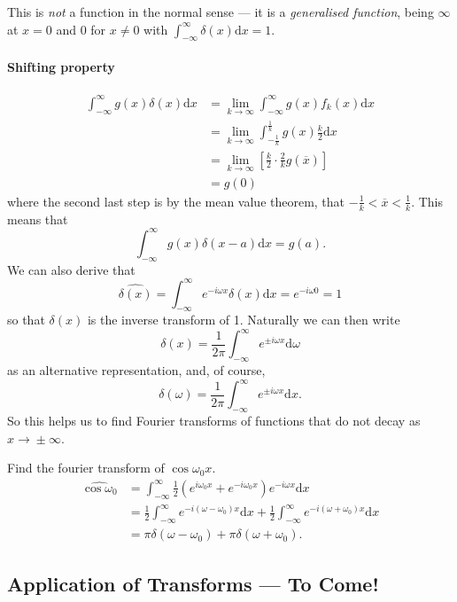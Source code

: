 \documentclass[12pt]{report}
\theoremstyle{definition}
\begin{document}
This is \emph{not} a function in the normal sense ---
it is a \emph{generalised function}, being $\infty$ at $x=0$ and 0 for $x\neq 0$
with $\int_{-\infty}^{\infty} \delta(x)\mathrm{d}x=1$.

\paragraph{Shifting property}
\begin{align*}
    \int_{-\infty}^{\infty} g(x)\delta(x)\mathrm{d}x
    & = \lim_{k\rightarrow{}\infty}\int_{-\infty}^{\infty} g(x)f_k(x)\mathrm{d}x \\
    & = \lim_{k\rightarrow{}\infty}\int_{-\frac{1}{k}}^{\frac{1}{k}} g(x)\frac{k}{2}\mathrm{d}x \\
    & = \lim_{k\rightarrow{}\infty}\left[\frac{k}{2}\cdot \frac{2}{k}g(\overline{x})\right] \\
    & = g(0)
\end{align*} 
where the second last step is by the mean value theorem, that $-\frac{1}{k}<\overline{x}<\frac{1}{k}$.
This means that\[
    \int_{-\infty}^{\infty} g(x)\delta(x-a)\mathrm{d}x = g(a).
\]We can also derive that\[
\widehat{\delta(x)} = \int_{-\infty}^{\infty} e^{-i\omega x}\delta(x)\mathrm{d}x = e^{-i\omega 0}= 1
\]
so that $\delta(x)$ is the inverse transform of 1. Naturally we can then write\[
    \delta(x) = \frac{1}{2\pi}\int_{-\infty}^{\infty} e^{\pm i\omega x}\mathrm{d}\omega
\]as an alternative representation, and, of course,\[
    \delta(\omega) = \frac{1}{2\pi}\int_{-\infty}^{\infty} e^{\pm i\omega x}\mathrm{d}x.
\]So this helps us to find Fourier transforms of functions that do not decay as $x\rightarrow{}\pm\infty$.

\begin{ex}
    Find the fourier transform of $\cos{\omega_0x}$.
    \begin{align*}
        \widehat{\cos{\omega_0}}
        & = \int_{-\infty}^{\infty} \frac{1}{2}(e^{i\omega_0x}+e^{-i\omega_0x})e^{-i\omega x}\mathrm{d}x \\
        & = \frac{1}{2}\int_{-\infty}^{\infty} e^{-i(\omega-\omega_0)x}\mathrm{d}x
        + \frac{1}{2}\int_{-\infty}^{\infty} e^{-i(\omega+\omega_0)x}\mathrm{d}x \\
        & = \pi\delta(\omega-\omega_0) + \pi\delta(\omega+\omega_0).
    \end{align*}
\end{ex} 

\subsection{Application of Transforms --- To Come!}
\end{document}
